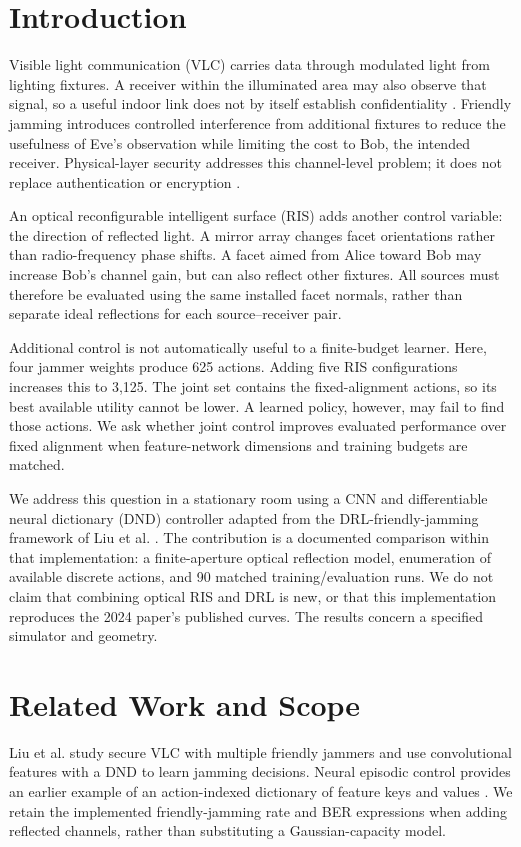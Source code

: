 \documentclass[journal,10pt,twocolumn]{IEEEtran}
\begin{document}
\section{Introduction}
Visible light communication (VLC) carries data through modulated light from lighting fixtures. A receiver within the illuminated area may also observe that signal, so a useful indoor link does not by itself establish confidentiality \cite{pathak2015visible,liu2024smart}. Friendly jamming introduces controlled interference from additional fixtures to reduce the usefulness of Eve's observation while limiting the cost to Bob, the intended receiver. Physical-layer security addresses this channel-level problem; it does not replace authentication or encryption \cite{bloch2008wireless}.

An optical reconfigurable intelligent surface (RIS) adds another control variable: the direction of reflected light. A mirror array changes facet orientations rather than radio-frequency phase shifts. A facet aimed from Alice toward Bob may increase Bob's channel gain, but can also reflect other fixtures. All sources must therefore be evaluated using the same installed facet normals, rather than separate ideal reflections for each source--receiver pair.

Additional control is not automatically useful to a finite-budget learner. Here, four jammer weights produce 625 actions. Adding five RIS configurations increases this to 3,125. The joint set contains the fixed-alignment actions, so its best available utility cannot be lower. A learned policy, however, may fail to find those actions. We ask whether joint control improves evaluated performance over fixed alignment when feature-network dimensions and training budgets are matched.

We address this question in a stationary room using a CNN and differentiable neural dictionary (DND) controller adapted from the DRL-friendly-jamming framework of Liu et al. \cite{liu2024smart}. The contribution is a documented comparison within that implementation: a finite-aperture optical reflection model, enumeration of available discrete actions, and 90 matched training/evaluation runs. We do not claim that combining optical RIS and DRL is new, or that this implementation reproduces the 2024 paper's published curves. The results concern a specified simulator and geometry.

\section{Related Work and Scope}
Liu et al. \cite{liu2024smart} study secure VLC with multiple friendly jammers and use convolutional features with a DND to learn jamming decisions. Neural episodic control provides an earlier example of an action-indexed dictionary of feature keys and values \cite{pritzel2017neural}. We retain the implemented friendly-jamming rate and BER expressions when adding reflected channels, rather than substituting a Gaussian-capacity model.
\end{document}
